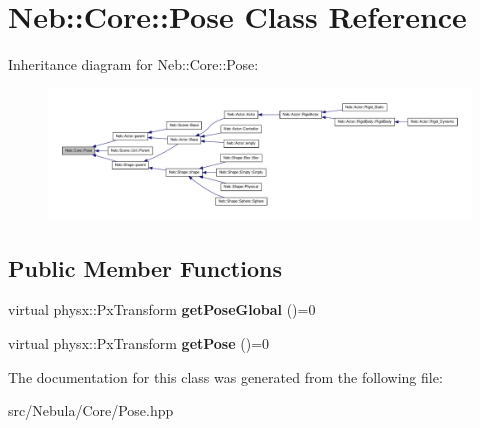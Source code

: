\hypertarget{classNeb_1_1Core_1_1Pose}{\section{\-Neb\-:\-:\-Core\-:\-:\-Pose \-Class \-Reference}
\label{classNeb_1_1Core_1_1Pose}
}


\-Inheritance diagram for \-Neb\-:\-:\-Core\-:\-:\-Pose\-:\nopagebreak
\begin{figure}[H]
\begin{center}
\leavevmode
\includegraphics[width=350pt]{classNeb_1_1Core_1_1Pose__inherit__graph}
\end{center}
\end{figure}
\subsection*{\-Public \-Member \-Functions}
\begin{DoxyCompactItemize}
\item 
\hypertarget{classNeb_1_1Core_1_1Pose_a68344a73874b28cfc25608c802c030ca}{virtual physx\-::\-Px\-Transform {\bfseries get\-Pose\-Global} ()=0}\label{classNeb_1_1Core_1_1Pose_a68344a73874b28cfc25608c802c030ca}

\item 
\hypertarget{classNeb_1_1Core_1_1Pose_a85727b01252cd84bfe2d99fedbacd29f}{virtual physx\-::\-Px\-Transform {\bfseries get\-Pose} ()=0}\label{classNeb_1_1Core_1_1Pose_a85727b01252cd84bfe2d99fedbacd29f}

\end{DoxyCompactItemize}


\-The documentation for this class was generated from the following file\-:\begin{DoxyCompactItemize}
\item 
src/\-Nebula/\-Core/\-Pose.\-hpp\end{DoxyCompactItemize}

